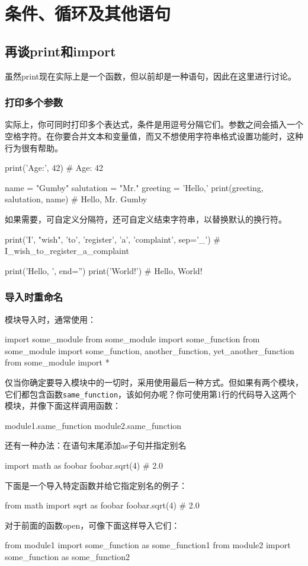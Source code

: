 \chapter{条件、循环及其他语句\label{chapter05}}
\section{再谈print和import}
虽然print现在实际上是一个函数，但以前却是一种语句，因此在这里进行讨论。
\subsection{打印多个参数}
实际上，你可同时打印多个表达式，条件是用逗号分隔它们。参数之间会插入一个空格字符。在你要合并文本和变量值，而又不想使用字符串格式设置功能时，这种行为很有帮助。
\begin{pyc}
print('Age:', 42)  # Age: 42

name = "Gumby"
salutation = "Mr."
greeting = 'Hello,'
print(greeting, salutation, name)  # Hello, Mr. Gumby
\end{pyc}
如果需要，可自定义分隔符，还可自定义结束字符串，以替换默认的换行符。
\begin{pyc}
print('I', "wish", 'to', 'register', 'a', 'complaint', sep='_')
# I_wish_to_register_a_complaint

print('Hello, ', end='')
print('World!')
# Hello, World!
\end{pyc}
\subsection{导入时重命名}
模块导入时，通常使用：
\begin{pyc}
import some_module
from some_module import some_function
from some_module import some_function, another_function, yet_another_function
from some_module import * 
\end{pyc}
仅当你确定要导入模块中的一切时，采用使用最后一种方式。但如果有两个模块，它们都包含函数\verb|same_function|，该如何办呢？你可使用第1行的代码导入这两个模块，并像下面这样调用函数：
\begin{pyc}
module1.same_function
module2.same_function
\end{pyc}

还有一种办法：在语句末尾添加as子句并指定别名
\begin{pyc}
import math as foobar
foobar.sqrt(4)  # 2.0
\end{pyc}
下面是一个导入特定函数并给它指定别名的例子：
\begin{pyc}
from math import sqrt as foobar
foobar.sqrt(4)  # 2.0
\end{pyc}
对于前面的函数open，可像下面这样导入它们：
\begin{pyc}
from module1 import some_function as some_function1
from module2 import some_function as some_function2
\end{pyc}
